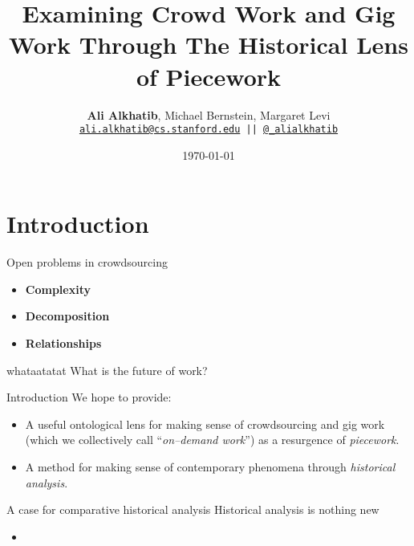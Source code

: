 \documentclass{beamer}
\title{Examining Crowd Work and Gig Work Through The Historical Lens of Piecework}
\author{\textbf{Ali Alkhatib},
                Michael Bernstein,
                Margaret Levi\\
\texttt{ \scriptsize{\href{mailto:ali.alkhatib@cs.stanford.edu}{ali.alkhatib@cs.stanford.edu} ||
         \href{http://twitter.com/_alialkhatib}{@\_alialkhatib}} }}
\institute[Stanford]{Stanford University}
\date{\today}
\begin{document}
\begin{frame}
\titlepage
\end{frame}



\section*{Introduction}

\begin{frame}{Open problems in crowdsourcing}
  \begin{itemize}%
    \item \textbf{Complexity}~\textcite{suzukiAtelier,KimStoria,yuanAlmost,
                           Nebeling:2016:WCW:2858036.2858169,
                           Hahn:2016:KAB:2858036.2858364}
    \item \textbf{Decomposition}~\textcite{sensitiveTasks,LykourentzouPersonalityMatters,
                              Law:2016:CKC:2858036.2858144,
                              Chang:2016:ACC:2858036.2858411,
                              Newell:2016:OMA:2858036.2858490}
    \item \textbf{Relationships}~\textcite{turkopticon,storiesIraniSilberman,crowdcollab,
                              takingAHITMcInnis}
  \end{itemize}
\end{frame}

\begin{frame}[standout]{whataatatat}
    What is the future of work?


\end{frame}


\begin{frame}{Introduction}
  We hope to provide:
      \begin{itemize}
        \item A useful ontological lens for making sense of crowdsourcing and gig work (which we collectively call ``\textit{on--demand work}'') as a resurgence of \textit{piecework}.
        \item A method for making sense of contemporary phenomena through \textit{historical analysis}.
      \end{itemize}
\end{frame}

\begin{frame}{A case for comparative historical analysis}
Historical analysis is nothing new
    \begin{itemize}
      \item \textcite{Wyche2006,bodker1993historical}
    \end{itemize}
\end{frame}
\end{document}
